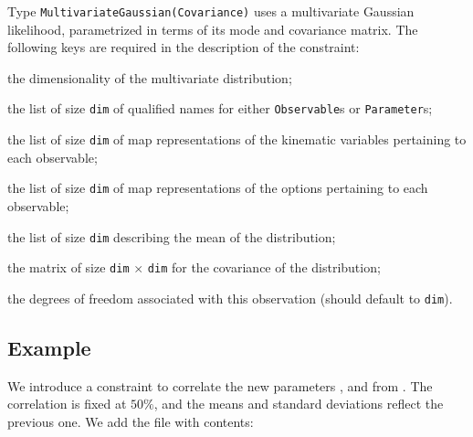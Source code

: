 Type \texttt{MultivariateGaussian(Covariance)} uses a multivariate Gaussian
likelihood, parametrized in terms of its mode and covariance matrix. The
following keys are required in the description of the constraint:
\begin{description}[labelwidth=.15\textwidth]
    \item[\texttt{dim}] the dimensionality of the multivariate distribution;
    \item[\texttt{observable}] the list of size \texttt{dim} of qualified names for either \texttt{Observable}s or \texttt{Parameter}s;
    \item[\texttt{kinematics}] the list of size \texttt{dim} of map representations of the kinematic variables pertaining to each observable;
    \item[\texttt{options}] the list of size \texttt{dim} of map representations of the options pertaining to each observable;
    \item[\texttt{mean}] the list of size \texttt{dim} describing the mean of the distribution;
    \item[\texttt{covariance}] the matrix of size \texttt{dim} $\times$ \texttt{dim} for the covariance of the distribution;
    \item[\texttt{dof}] the degrees of freedom associated with this observation (should default to \texttt{dim}).
\end{description}

\subsection*{Example}

We introduce a constraint to correlate the new parameters
, and  from
. The correlation is fixed at $50\%$, and the means
and standard deviations reflect the previous one. We add the file
 with contents:
